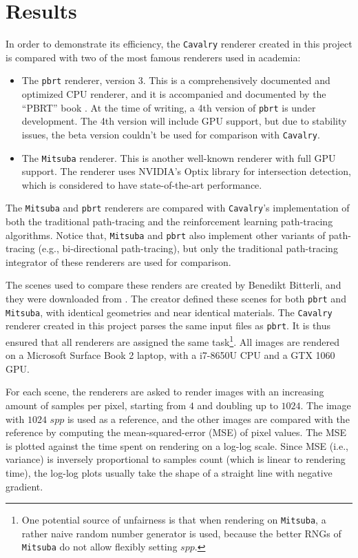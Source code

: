 \chapter{Results}

In order to demonstrate its efficiency, the \texttt{Cavalry} renderer created in this project is compared with two of the most famous renderers used in academia:

\begin{itemize}
    \item The \texttt{pbrt} renderer, version 3. This is a comprehensively documented and optimized CPU renderer, and it is accompanied and documented by the ``PBRT'' book \cite{pharr2016physically}. At the time of writing, a 4th version of \texttt{pbrt} is under development. The 4th version will include GPU support, but due to stability issues, the beta version couldn't be used for comparison with \texttt{Cavalry}.
    
    \item The \texttt{Mitsuba} renderer. This is another well-known renderer with full GPU support. The renderer uses NVIDIA's Optix library for intersection detection, which is considered to have state-of-the-art performance.  
\end{itemize}

The \texttt{Mitsuba} and \texttt{pbrt} renderers are compared with \texttt{Cavalry}'s implementation of both the traditional path-tracing and the reinforcement learning path-tracing algorithms. Notice that, \texttt{Mitsuba} and \texttt{pbrt} also implement other variants of path-tracing (e.g., bi-directional path-tracing), but only the traditional path-tracing integrator of these renderers are used for comparison.

The scenes used to compare these renders are created by Benedikt Bitterli, and they were downloaded from \cite{resources16}. The creator defined these scenes for both \texttt{pbrt} and \texttt{Mitsuba}, with identical geometries and near identical materials. The \texttt{Cavalry} renderer created in this project parses the same input files as \texttt{pbrt}. It is thus ensured that all renderers are assigned the same task\footnote{One potential source of unfairness is that when rendering on \texttt{Mitsuba}, a rather naive random number generator is used, because the better RNGs of \texttt{Mitsuba} do not allow flexibly setting $spp$.}. All images are rendered on a Microsoft Surface Book 2 laptop, with a i7-8650U CPU and a GTX 1060 GPU.

For each scene, the renderers are asked to render images with an increasing amount of samples per pixel, starting from $4$ and doubling up to $1024$. The image with $1024$ $spp$ is used as a reference, and the other images are compared with the reference by computing the mean-squared-error (MSE) of pixel values. The MSE is plotted against the time spent on rendering on a log-log scale. Since MSE (i.e., variance) is inversely proportional to samples count (which is linear to rendering time), the log-log plots usually take the shape of a straight line with negative gradient.

